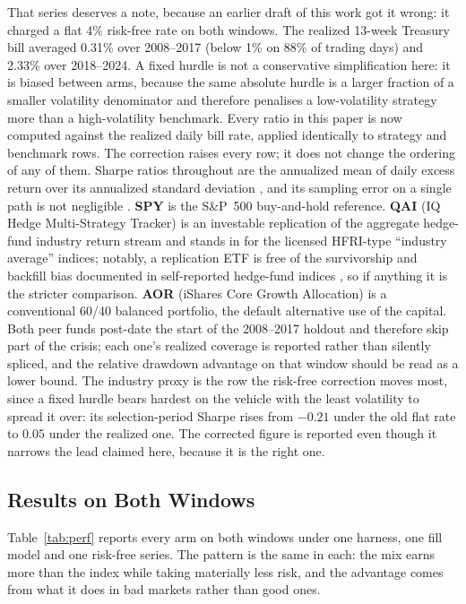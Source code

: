 \documentclass[10pt,twocolumn]{IEEEtran}
\begin{document}
That series deserves a note, because an earlier draft of this work got it
wrong: it charged a flat 4\% risk-free rate on both windows. The realized
13-week Treasury bill averaged 0.31\% over 2008--2017 (below 1\% on 88\% of
trading days) and 2.33\% over 2018--2024. A fixed hurdle is not a
conservative simplification here: it is biased between arms, because the same
absolute hurdle is a larger fraction of a smaller volatility denominator and
therefore penalises a low-volatility strategy more than a high-volatility
benchmark. Every ratio in this paper is now computed against the realized daily
bill rate, applied identically to strategy and benchmark rows. The correction
raises every row; it does not change the ordering of any of them. Sharpe ratios
throughout are the annualized mean of daily excess return over its annualized
standard deviation \cite{sharpe1994}, and its sampling error on a single path
is not negligible \cite{lo2002statistics}. \textbf{SPY} is the S\&P~500
buy-and-hold reference. \textbf{QAI} (IQ Hedge Multi-Strategy Tracker) is an
investable replication of the aggregate hedge-fund industry return stream and
stands in for the licensed HFRI-type ``industry average'' indices; notably, a
replication ETF is free of the survivorship and backfill bias documented in
self-reported hedge-fund indices \cite{fung2000performance}, so if anything it
is the stricter comparison. \textbf{AOR} (iShares Core Growth Allocation) is a
conventional 60/40 balanced portfolio, the default alternative use of the
capital. Both peer funds post-date the start of the 2008--2017 holdout and
therefore skip part of the crisis; each one's realized coverage is reported
rather than silently spliced, and the relative drawdown advantage on that
window should be read as a lower bound. The industry proxy is the row the
risk-free correction moves most, since a fixed hurdle bears hardest on the
vehicle with the least volatility to spread it over: its selection-period
Sharpe rises from $-0.21$ under the old flat rate to $0.05$ under the realized
one. The corrected figure is reported even though it narrows the lead claimed
here, because it is the right one.

\subsection{Results on Both Windows}

Table~\ref{tab:perf} reports every arm on both windows under one harness, one
fill model and one risk-free series. The pattern is the same in each: the mix
earns more than the index while taking materially less risk, and the advantage
comes from what it does in bad markets rather than good ones.
\end{document}
